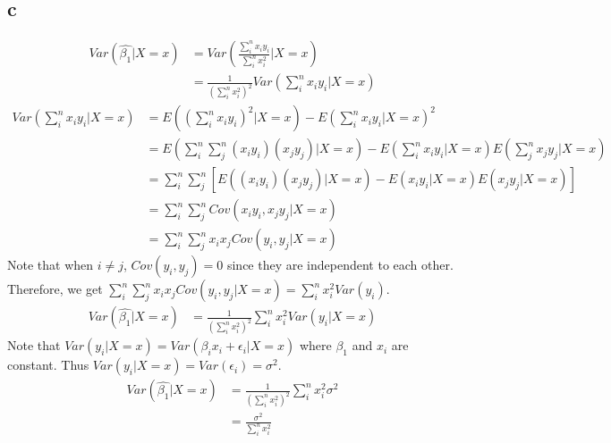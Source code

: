 \documentclass[11pt,letterpaper]{article}
\begin{document}
\subsection*{c}
\begin{align*}
Var(\hat{\beta_1} | X=x) &= Var(\frac{\sum_i^n x_i y_i}{\sum_i^n x_i^2} | X=x) \\
&= \frac{1}{(\sum_i^n x_i^2)^2} Var(\sum_i^n x_i y_i |X=x)
\end{align*}
\begin{align*}
Var(\sum_i^n x_i y_i |X=x) &= E((\sum_i^n x_i y_i)^2 |X=x) - E(\sum_i^n x_i y_i |X=x)^2 \\
&= E(\sum_i^n \sum_j^n (x_i y_i) (x_j y_j) |X=x) - E(\sum_i^n x_i y_i |X=x) E(\sum_j^n x_j y_j |X=x) \\
&= \sum_i^n \sum_j^n [E((x_i y_i)(x_j y_j)|X=x) - E(x_i y_i |X=x)E(x_j y_j |X=x)]\\
&= \sum_i^n \sum_j^n Cov(x_i y_i, x_j y_j |X=x) \\
&= \sum_i^n \sum_j^n x_i x_jCov( y_i, y_j |X=x)
\end{align*}
\noindent Note that when $i \neq j$, $Cov(y_i, y_j) = 0$ since they are independent to each other. \\

\noindent Therefore, we get $\sum_i^n \sum_j^n x_i x_jCov( y_i, y_j |X=x) = \sum_i^n x_i^2 Var(y_i)$. 
\begin{align*}
Var(\hat{\beta_1} | X=x)  &= \frac{1}{(\sum_i^n x_i^2)^2} \sum_i^n x_i^2 Var(y_i | X=x)
\end{align*}
\noindent Note that $Var(y_i |X=x) = Var(\beta_i x_i + \epsilon_i | X=x)$ where $\beta_1$ and $x_i$ are constant. Thus $Var(y_i |X=x) = Var(\epsilon_i) = \sigma^2$.
\begin{align*}
Var(\hat{\beta_1} | X=x)  &= \frac{1}{(\sum_i^n x_i^2)^2} \sum_i^n x_i^2 \sigma^2 \\
&= \frac{\sigma^2}{\sum_i^n x_i^2}
\end{align*}
\end{document}
